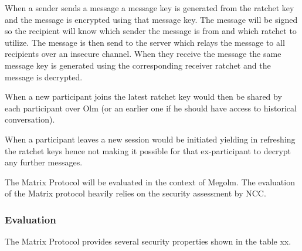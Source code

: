 When a sender sends a message a message key is generated from the ratchet key and the message is encrypted using that message key. The message will be signed so the recipient will know which sender the message is from and which ratchet to utilize. %
The message  is then send to the server which relays the message to all recipients over an insecure channel. When they receive the message the same message key is generated using the corresponding receiver ratchet and the message is decrypted. 

When a new participant joins the latest ratchet key would then be shared by each participant over Olm (or an earlier one if he should have access to historical conversation). 

When a participant leaves a new session would be initiated yielding in refreshing the ratchet keys hence not making it possible for that ex-participant to decrypt any further messages.





The Matrix Protocol will be evaluated in the context of Megolm. The evaluation of the Matrix protocol heavily relies on the security assessment by NCC.


\subsubsection{Evaluation}

The Matrix Protocol provides several security properties shown in the table xx. 


